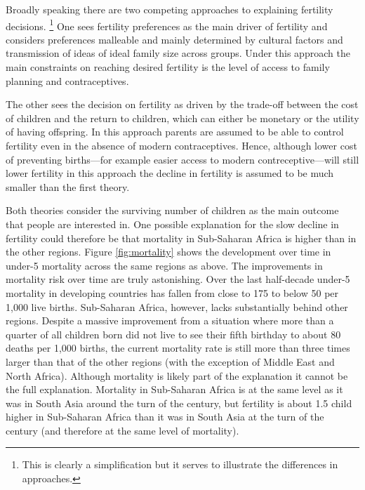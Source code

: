 \documentclass[letterpaper,12pt]{article}
\begin{document}
Broadly speaking there are two competing approaches to 
explaining fertility decisions.%
\footnote{
This is clearly a simplification but it serves to illustrate
the differences in approaches.
}
One sees fertility preferences as the main driver of fertility and
considers preferences malleable and mainly determined by cultural 
factors and transmission of ideas of ideal family size across groups.
Under this approach the main constraints on reaching desired 
fertility is the level of access to family planning and 
contraceptives.

The other sees the decision on fertility as driven by the
trade-off between the cost of children and the return to children,
which can either be monetary or the utility of having offspring.
In this approach parents are assumed to be able to control 
fertility even in the absence of modern contraceptives.
Hence, although lower cost of preventing births---for example
easier access to modern contreceptive---will still lower
fertility in this approach the decline in fertility is 
assumed to be much smaller than the first theory.

Both theories consider the surviving number of children as
the main outcome that people are interested in.
One possible explanation for the slow decline in fertility
could therefore be that mortality in Sub-Saharan Africa is
higher than in the other regions.
Figure \ref{fig:mortality} shows the development over time in 
under-5 mortality across the same regions as above.
The improvements in mortality risk over time are truly astonishing.
Over the last half-decade under-5 mortality in developing countries 
has fallen from close to 175 to below 50 per 1,000 live births.
Sub-Saharan Africa, however, lacks substantially behind other regions.
Despite a massive improvement from a situation where more than a
quarter of all children born did not live to see their fifth
birthday to about 80 deaths per 1,000 births, the current mortality 
rate is still more than three times larger than that of the other 
regions (with the exception of Middle East and North Africa).
Although mortality is likely part of the explanation it cannot
be the full explanation.
Mortality in Sub-Saharan Africa is at the same level as it was
in South Asia around the turn of the century, but fertility
is about 1.5 child higher in Sub-Saharan Africa than it was
in South Asia at the turn of the century (and therefore at the
same level of mortality).
\end{document}
